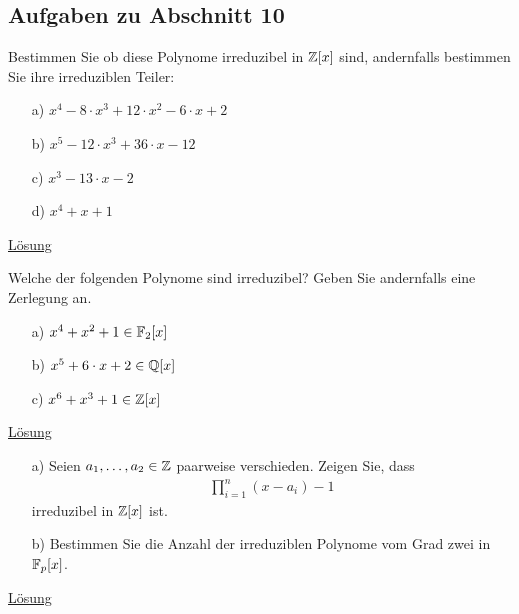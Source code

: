 \subsection{Aufgaben zu Abschnitt 10}

\begin{exe}\label{aufgabe:10.1}
	Bestimmen Sie ob diese Polynome irreduzibel in $ \mathbb{Z}[x] $ sind,
	andernfalls bestimmen Sie ihre irreduziblen Teiler:
	\begin{enumerate}
		\item[a)]
		$ x^4 -8 \cdot x^3 + 12 \cdot x^2 - 6\cdot x + 2 $
		
		\item[b)]
		$ x^5 - 12 \cdot x^3 + 36 \cdot x - 12 $
		
		\item[c)]
		$ x^3 - 13\cdot x - 2 $
		
		\item[d)] 
		$ x^4 + x + 1 $   
	\end{enumerate}
	\hyperlink{loes:10.1}{Lösung}
\end{exe}

\begin{exe}\label{aufgabe:10.2}
	Welche der folgenden Polynome sind irreduzibel?
	Geben Sie andernfalls eine Zerlegung an.
	\begin{enumerate}
		\item[a)]
		$ x^4 + x^2 +1 \in \mathbb{F}_2[x]  $
		
		\item[b)]
		$ x^5 + 6 \cdot x + 2 \in \mathbb{Q}[x] $
		
		\item[c)]
		$ x^6 + x^3 +1 \in \mathbb{Z}[x] $  
	\end{enumerate}
	\hyperlink{loes:10.2}{Lösung}
\end{exe}

\begin{exe}\label{aufgabe:10.3}
	\begin{enumerate}
		\item[a)]
		Seien $ a_1,\dots,a_2 \in \mathbb{Z} $ paarweise verschieden.
		Zeigen Sie, dass
		\begin{align*}
		\prod \limits_{i=1}^n (x-a_i) - 1
		\end{align*}
		irreduzibel in $ \mathbb{Z}[x] $ ist.
		
		\item[b)]
		Bestimmen Sie die Anzahl der irreduziblen Polynome vom Grad zwei
		in $ \mathbb{F}_p[x] $. 
	\end{enumerate}
	\hyperlink{loes:10.3}{Lösung}
\end{exe}

